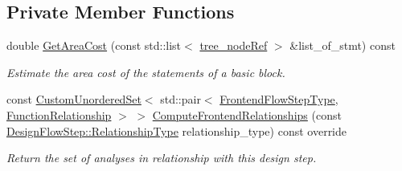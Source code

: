 \subsection*{Private Member Functions}
\begin{DoxyCompactItemize}
\item 
double \hyperlink{classMultipleEntryIfReduction_ac6f3dc9035b0d68e3130655939dc1d16}{Get\+Area\+Cost} (const std\+::list$<$ \hyperlink{tree__node_8hpp_a6ee377554d1c4871ad66a337eaa67fd5}{tree\+\_\+node\+Ref} $>$ \&list\+\_\+of\+\_\+stmt) const
\begin{DoxyCompactList}\small\item\em Estimate the area cost of the statements of a basic block. \end{DoxyCompactList}\item 
const \hyperlink{classCustomUnorderedSet}{Custom\+Unordered\+Set}$<$ std\+::pair$<$ \hyperlink{frontend__flow__step_8hpp_afeb3716c693d2b2e4ed3e6d04c3b63bb}{Frontend\+Flow\+Step\+Type}, \hyperlink{classFrontendFlowStep_af7cf30f2023e5b99e637dc2058289ab0}{Function\+Relationship} $>$ $>$ \hyperlink{classMultipleEntryIfReduction_a14ca1aca808b8519a8504ac06cf11cc6}{Compute\+Frontend\+Relationships} (const \hyperlink{classDesignFlowStep_a723a3baf19ff2ceb77bc13e099d0b1b7}{Design\+Flow\+Step\+::\+Relationship\+Type} relationship\+\_\+type) const override
\begin{DoxyCompactList}\small\item\em Return the set of analyses in relationship with this design step. \end{DoxyCompactList}\end{DoxyCompactItemize}

